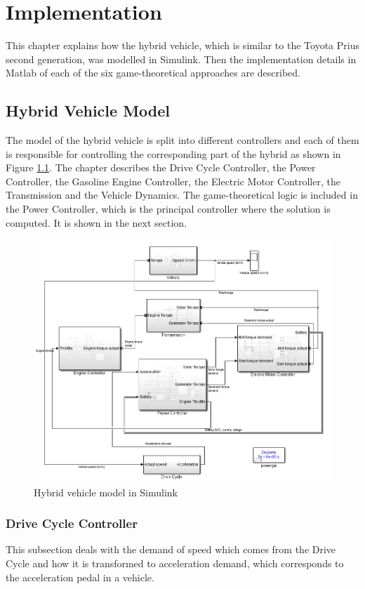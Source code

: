 \chapter{Implementation}
\label{chp:implementation}
This chapter explains how the hybrid vehicle, which is similar to the Toyota Prius second generation, was modelled in Simulink. Then the implementation details in Matlab of each of the six game-theoretical approaches are described.

\section{Hybrid Vehicle Model}
The model of the hybrid vehicle is split into different controllers and each of them is responsible for controlling the corresponding part of the hybrid as shown in Figure \ref{fig:hev}. The chapter describes the Drive Cycle Controller, the Power Controller, the Gasoline Engine Controller, the Electric Motor Controller, the Transmission and the Vehicle Dynamics. The game-theoretical logic is included in the Power Controller, which is the principal controller where the solution is computed. It is shown in the next section.

\begin{figure}[h]
\centering
\includegraphics[scale=0.5]{figures/hev}
\caption{Hybrid vehicle model in Simulink}
\label{fig:hev}
\end{figure}

\subsection{Drive Cycle Controller}
This subsection deals with the demand of speed which comes from the Drive Cycle and how it is transformed to acceleration demand, which corresponds to the acceleration pedal in a vehicle.


